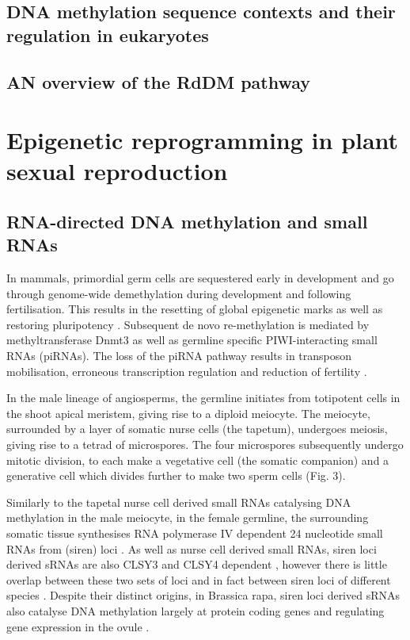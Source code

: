 \subsection{DNA methylation sequence contexts and their regulation in eukaryotes}
\subsection{AN overview of the RdDM pathway}

\section{Epigenetic reprogramming in plant sexual reproduction} %
\subsection{RNA-directed DNA methylation and small RNAs}

In mammals, primordial germ cells are sequestered early in development and go through genome-wide demethylation during development and following fertilisation. This results in the resetting of global epigenetic marks as well as restoring pluripotency \citep{RN210}. Subsequent de novo re-methylation is mediated by methyltransferase Dnmt3 as well as germline specific PIWI-interacting small RNAs (piRNAs). The loss of the piRNA pathway results in transposon mobilisation, erroneous transcription regulation and reduction of fertility \citep{RN124,RN125,RN126}.

In the male lineage of angiosperms, the germline initiates from totipotent cells in the shoot apical meristem, giving rise to a diploid meiocyte. The meiocyte, surrounded by a layer of somatic nurse cells (the tapetum), undergoes meiosis, giving rise to a tetrad of microspores. The four microspores subsequently undergo mitotic division, to each make a vegetative cell (the somatic companion) and a generative cell which divides further to make two sperm cells (Fig. 3). 

Similarly to the tapetal nurse cell derived small RNAs catalysing DNA methylation in the male meiocyte, in the female germline, the surrounding somatic tissue synthesises RNA polymerase IV dependent 24 nucleotide small RNAs from (siren) loci \citep{RN164,RN163,RN162}. As well as nurse cell derived small RNAs, siren loci derived sRNAs are also CLSY3 and CLSY4 dependent \citep{RN162}, however there is little overlap between these two sets of loci and in fact between siren loci of different species \citep{RN163}. Despite their distinct origins, in Brassica rapa, siren loci derived sRNAs also catalyse DNA methylation largely at protein coding genes and regulating gene expression in the ovule \citep{RN165}. 

